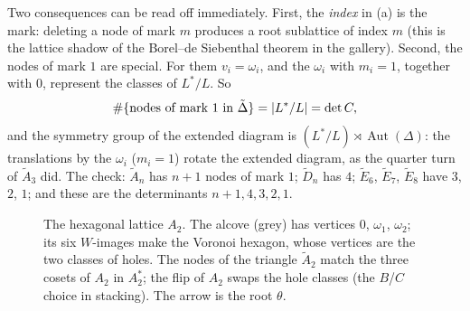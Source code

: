 Two consequences can be read off immediately. First, the \emph{index} in (a) is the mark: deleting a node
of mark $m$ produces a root sublattice of index $m$ (this is the lattice shadow of the Borel--de Siebenthal
theorem in the gallery). Second, the nodes of mark $1$ are special. For them $v_i=\omega_i$, and the
$\omega_i$ with $m_i=1$, together with $0$, represent the classes of $L^*/L$. So
\[
  \#\{\text{nodes of mark }1\text{ in }\tilde\Delta\}=\left\lvert L^*/L \right\rvert=\det C,
\]
and the symmetry group of the extended diagram is $(L^*/L)\rtimes\operatorname{Aut}(\Delta)$: the
translations by the $\omega_i$ ($m_i=1$) rotate the extended diagram, as the quarter turn of $\tilde A_3$ did.
The check: $\tilde A_n$ has $n+1$ nodes of mark $1$; $\tilde D_n$ has $4$; $\tilde E_6$, $\tilde E_7$,
$\tilde E_8$ have $3$, $2$, $1$; and these are the determinants $n+1,4,3,2,1$.

\begin{figure}[ht]
\centering
{}
\caption{The hexagonal lattice $A_2$. The alcove (grey) has vertices $0$, $\omega_1$, $\omega_2$; its six
$W$-images make the Voronoi hexagon, whose vertices are the two classes of holes. The nodes of the
triangle $\tilde A_2$ match the three cosets of $A_2$ in $A_2^*$; the flip of $A_2$ swaps the hole
classes (the $B$/$C$ choice in stacking). The arrow is the root $\theta$.}
\label{DYN:fig:hex}
\end{figure}

